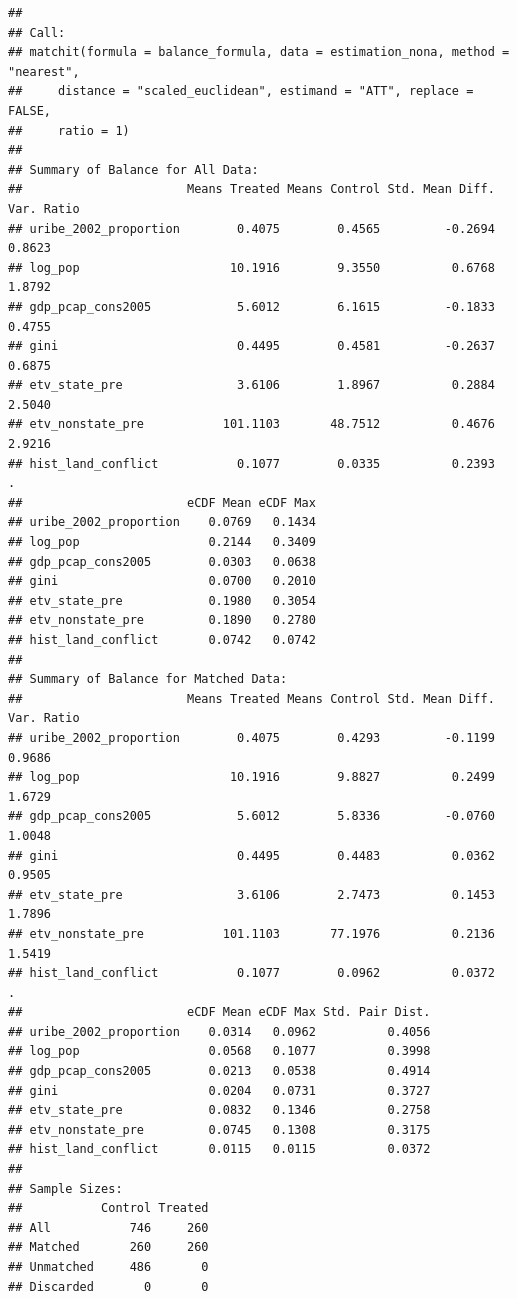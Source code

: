 \documentclass[
]{article}
\begin{document}
\begin{verbatim}
## 
## Call:
## matchit(formula = balance_formula, data = estimation_nona, method = "nearest", 
##     distance = "scaled_euclidean", estimand = "ATT", replace = FALSE, 
##     ratio = 1)
## 
## Summary of Balance for All Data:
##                       Means Treated Means Control Std. Mean Diff. Var. Ratio
## uribe_2002_proportion        0.4075        0.4565         -0.2694     0.8623
## log_pop                     10.1916        9.3550          0.6768     1.8792
## gdp_pcap_cons2005            5.6012        6.1615         -0.1833     0.4755
## gini                         0.4495        0.4581         -0.2637     0.6875
## etv_state_pre                3.6106        1.8967          0.2884     2.5040
## etv_nonstate_pre           101.1103       48.7512          0.4676     2.9216
## hist_land_conflict           0.1077        0.0335          0.2393          .
##                       eCDF Mean eCDF Max
## uribe_2002_proportion    0.0769   0.1434
## log_pop                  0.2144   0.3409
## gdp_pcap_cons2005        0.0303   0.0638
## gini                     0.0700   0.2010
## etv_state_pre            0.1980   0.3054
## etv_nonstate_pre         0.1890   0.2780
## hist_land_conflict       0.0742   0.0742
## 
## Summary of Balance for Matched Data:
##                       Means Treated Means Control Std. Mean Diff. Var. Ratio
## uribe_2002_proportion        0.4075        0.4293         -0.1199     0.9686
## log_pop                     10.1916        9.8827          0.2499     1.6729
## gdp_pcap_cons2005            5.6012        5.8336         -0.0760     1.0048
## gini                         0.4495        0.4483          0.0362     0.9505
## etv_state_pre                3.6106        2.7473          0.1453     1.7896
## etv_nonstate_pre           101.1103       77.1976          0.2136     1.5419
## hist_land_conflict           0.1077        0.0962          0.0372          .
##                       eCDF Mean eCDF Max Std. Pair Dist.
## uribe_2002_proportion    0.0314   0.0962          0.4056
## log_pop                  0.0568   0.1077          0.3998
## gdp_pcap_cons2005        0.0213   0.0538          0.4914
## gini                     0.0204   0.0731          0.3727
## etv_state_pre            0.0832   0.1346          0.2758
## etv_nonstate_pre         0.0745   0.1308          0.3175
## hist_land_conflict       0.0115   0.0115          0.0372
## 
## Sample Sizes:
##           Control Treated
## All           746     260
## Matched       260     260
## Unmatched     486       0
## Discarded       0       0
\end{verbatim}
\end{document}
